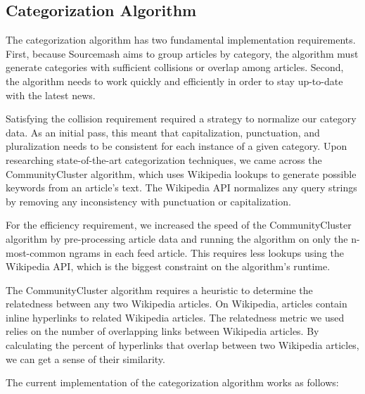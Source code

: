 \documentclass[11pt]{article}
\begin{document}
\subsection{Categorization Algorithm}

The categorization algorithm has two fundamental implementation requirements. First, because Sourcemash aims to group articles by category, the algorithm must generate categories with sufficient collisions or overlap among articles. Second, the algorithm needs to work quickly and efficiently in order to stay up-to-date with the latest news.

Satisfying the collision requirement required a strategy to normalize our category data. As an initial pass, this meant that capitalization, punctuation, and pluralization needs to be consistent for each instance of a given category. Upon researching state-of-the-art categorization techniques, we came across the CommunityCluster algorithm\cite{Grineva}, which uses Wikipedia lookups to generate possible keywords from an article's text. The Wikipedia API normalizes any query strings by removing any inconsistency with punctuation or capitalization.

For the efficiency requirement, we increased the speed of the CommunityCluster algorithm by pre-processing article data and running the algorithm on only the n-most-common ngrams in each feed article. This requires less lookups using the Wikipedia API, which is the biggest constraint on the algorithm's runtime.

The CommunityCluster algorithm requires a heuristic to determine the relatedness between any two Wikipedia articles. On Wikipedia, articles contain inline hyperlinks to related Wikipedia articles. The relatedness metric we used relies on the number of overlapping links between Wikipedia articles. By calculating the percent of hyperlinks that overlap between two Wikipedia articles, we can get a sense of their similarity.

The current implementation of the categorization algorithm works as follows:
\end{document}
